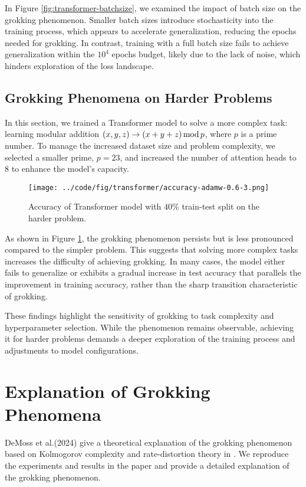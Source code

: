 \documentclass{article}
\begin{document}
In Figure \ref{fig:transformer-batchsize}, we examined the impact of batch size on the grokking phenomenon. Smaller batch sizes introduce stochasticity into the training process, which appears to accelerate generalization, reducing the epochs needed for grokking. In contrast, training with a full batch size fails to achieve generalization within the $10^4$ epochs budget, likely due to the lack of noise, which hinders exploration of the loss landscape.

\subsection{Grokking Phenomena on Harder Problems}

In this section, we trained a Transformer model to solve a more complex task: learning modular addition $(x, y, z) \rightarrow (x + y + z)\, {\rm mod}\, p$, where $p$ is a prime number. To manage the increased dataset size and problem complexity, we selected a smaller prime, $p=23$, and increased the number of attention heads to 8 to enhance the model's capacity.

\begin{figure}[ht]
    \centering
    \texttt{[image: ../code/fig/transformer/accuracy-adamw-0.6-3.png]}
    \caption{Accuracy of Transformer model with $40\%$ train-test split on the harder problem.}
    \label{fig:transformer-harder}
\end{figure}

As shown in Figure \ref{fig:transformer-harder}, the grokking phenomenon persists but is less pronounced compared to the simpler problem. This suggests that solving more complex tasks increases the difficulty of achieving grokking. In many cases, the model either fails to generalize or exhibits a gradual increase in test accuracy that parallels the improvement in training accuracy, rather than the sharp transition characteristic of grokking.

These findings highlight the sensitivity of grokking to task complexity and hyperparameter selection. While the phenomenon remains observable, achieving it for harder problems demands a deeper exploration of the training process and adjustments to model configurations.

\section{Explanation of Grokking Phenomena}

DeMoss et al.(2024) give a theoretical explanation of the grokking phenomenon based on Kolmogorov complexity and rate-distortion theory in \cite{demoss2024complexity}. We reproduce the experiments and results in the paper and provide a detailed explanation of the grokking phenomenon.
\end{document}
